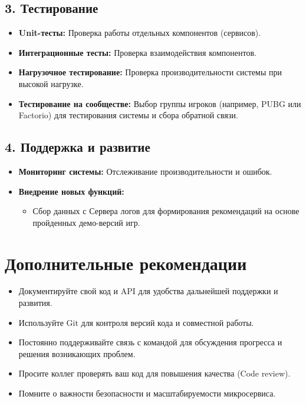 \documentclass[12pt, a4paper]{article}
\begin{document}
\subsection*{3. Тестирование}
\begin{itemize}
    \item \textbf{Unit-тесты:} Проверка работы отдельных компонентов (сервисов).
    \item \textbf{Интеграционные тесты:} Проверка взаимодействия компонентов.
    \item \textbf{Нагрузочное тестирование:} Проверка производительности системы при высокой нагрузке.
    \item \textbf{Тестирование на сообществе:} Выбор группы игроков (например, PUBG или Factorio) для тестирования системы и сбора обратной связи.
\end{itemize}

\subsection*{4. Поддержка и развитие}
\begin{itemize}
    \item \textbf{Мониторинг системы:} Отслеживание производительности и ошибок.
    \item \textbf{Внедрение новых функций:}
    \begin{itemize}
        \item Сбор данных с Сервера логов для формирования рекомендаций на основе пройденных демо-версий игр.
    \end{itemize}
\end{itemize}

\section*{Дополнительные рекомендации}
\begin{itemize}
    \item Документируйте свой код и API для удобства дальнейшей поддержки и развития.
    \item Используйте Git для контроля версий кода и совместной работы.
    \item Постоянно поддерживайте связь с командой для обсуждения прогресса и решения возникающих проблем.
    \item Просите коллег проверять ваш код для повышения качества (Code review).
    \item Помните о важности безопасности и масштабируемости микросервиса.
\end{itemize}
\end{document}
